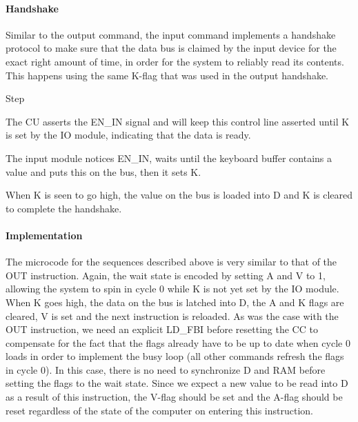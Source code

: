 \paragraph{Handshake} Similar to the output command, the input command implements a handshake protocol to make sure that the data bus is claimed by the input device for the exact right amount of time, in order for the system to reliably read its contents. This happens using the same K-flag that was used in the output handshake.

\begin{labeledenum}{Step}
\item The CU asserts the EN\_IN signal and will keep this control line asserted until K is set by the IO module, indicating that the data is ready.
\item The input module notices EN\_IN, waits until the keyboard buffer contains a value and puts this on the bus, then it sets K.
\item When K is seen to go high, the value on the bus is loaded into D and K is cleared to complete the handshake.
\end{labeledenum}

\paragraph{Implementation}
The microcode for the sequences described above is very similar to that of the OUT instruction. Again, the wait state is encoded by setting A and V to 1, allowing the system to spin in cycle 0 while K is not yet set by the IO module. When K goes high, the data on the bus is latched into D, the A and K flags are cleared, V is set and the next instruction is reloaded. As was the case with the OUT instruction, we need an explicit LD\_FBI before resetting the CC to compensate for the fact that the flags already have to be up to date when cycle 0 loads in order to implement the busy loop (all other commands refresh the flags in cycle 0). In this case, there is no need to synchronize D and RAM before setting the flags to the wait state. Since we expect a new value to be read into D as a result of this instruction, the V-flag should be set and the A-flag should be reset regardless of the state of the computer on entering this instruction.

